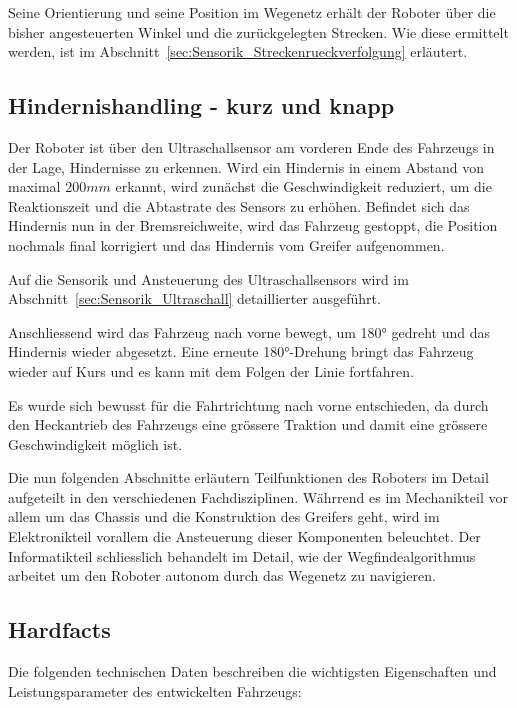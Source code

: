 \documentclass[main.tex]{subfiles} %
\begin{document}
Seine Orientierung und seine Position im Wegenetz erhält der Roboter über die
bisher angesteuerten Winkel und die zurückgelegten Strecken. Wie diese
ermittelt werden, ist im Abschnitt~\ref{sec:Sensorik_Streckenrueckverfolgung}
erläutert.


\subsection{Hindernishandling - kurz und knapp}

Der Roboter ist über den Ultraschallsensor am vorderen Ende des Fahrzeugs in
der Lage, Hindernisse zu erkennen. Wird ein Hindernis in einem Abstand von
maximal $200 mm$ erkannt, wird zunächst die Geschwindigkeit reduziert, um die
Reaktionszeit und die Abtastrate des Sensors zu erhöhen. Befindet sich das
Hindernis nun in der Bremsreichweite, wird das Fahrzeug gestoppt, die Position
nochmals final korrigiert und das Hindernis vom Greifer aufgenommen.

Auf die Sensorik und Ansteuerung des Ultraschallsensors wird im
Abschnitt~\ref{sec:Sensorik_Ultraschall} detaillierter ausgeführt.

Anschliessend wird das Fahrzeug nach vorne bewegt, um 180° gedreht und das
Hindernis wieder abgesetzt. Eine erneute 180°-Drehung bringt das Fahrzeug
wieder auf Kurs und es kann mit dem Folgen der Linie fortfahren.

Es wurde sich bewusst für die Fahrtrichtung nach vorne entschieden, da durch
den Heckantrieb des Fahrzeugs eine grössere Traktion und damit eine grössere
Geschwindigkeit möglich ist.


Die nun folgenden Abschnitte erläutern Teilfunktionen des Roboters im Detail
aufgeteilt in den verschiedenen Fachdisziplinen. Währrend es im Mechanikteil
vor allem um das Chassis und die Konstruktion des Greifers geht, wird im
Elektronikteil vorallem die Ansteuerung dieser Komponenten beleuchtet. Der
Informatikteil schliesslich behandelt im Detail, wie der Wegfindealgorithmus
arbeitet um den Roboter autonom durch das Wegenetz zu navigieren.

\newpage

\subsection{Hardfacts}

Die folgenden technischen Daten beschreiben die wichtigsten Eigenschaften und
Leistungsparameter des entwickelten Fahrzeugs:
\end{document}
